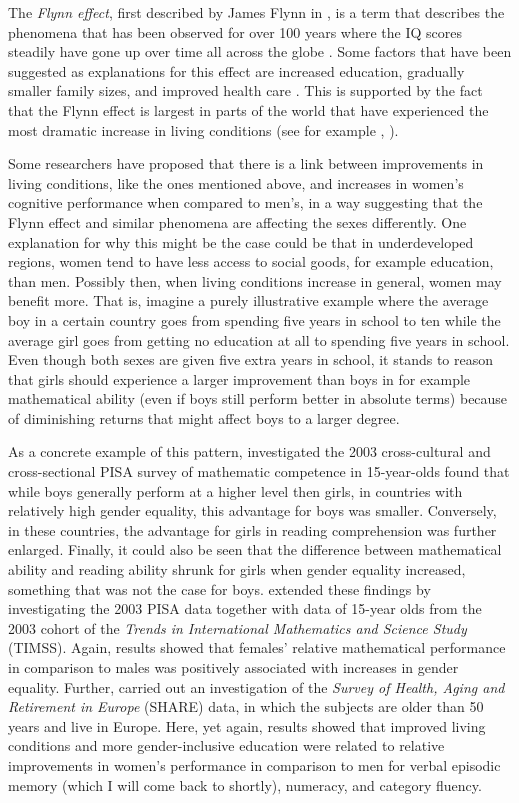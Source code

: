 The \emph{Flynn effect}, first described by James Flynn in \citeyear{Flynn1987}, is a term that describes the phenomena that has been observed for over 100 years where the IQ scores steadily have gone up over time all across the globe \parencite{Williams2013}. Some factors that have been suggested as explanations for this effect are increased education, gradually smaller family sizes, and improved health care \parencite{Pietschnig2015}. This is supported by the fact that the Flynn effect is largest in parts of the world that have experienced the most dramatic increase in living conditions (see for example \citeauthor{Weber2017}, \citeyear{Weber2017}).

Some researchers have proposed that there is a link between improvements in living conditions, like the ones mentioned above, and increases in women’s cognitive performance when compared to men's, in a way suggesting that the Flynn effect and similar phenomena are affecting the sexes differently. One explanation for why this might be the case could be that in underdeveloped regions, women tend to have less access to social goods, for example education, than men. Possibly then, when living conditions increase in general, women may benefit more. That is, imagine a purely illustrative example where the average boy in a certain country goes from spending five years in school to ten while the average girl goes from getting no education at all to spending five years in school. Even though both sexes are given five extra years in school, it stands to reason that girls should experience a larger improvement than boys in for example mathematical ability (even if boys still perform better in absolute terms) because of diminishing returns that might affect boys to a larger degree.

As a concrete example of this pattern, \textcite{Guiso2008} investigated the 2003 cross-cultural and cross-sectional PISA survey of mathematic competence in 15-year-olds found that while boys generally perform at a higher level then girls, in countries with relatively high gender equality, this advantage for boys was smaller. Conversely, in these countries, the advantage for girls in reading comprehension was further enlarged. Finally, it could also be seen that the difference between mathematical ability and reading ability shrunk for girls when gender equality increased, something that was not the case for boys. \textcite{ElseQuest2010} extended these findings by investigating the 2003 PISA data together with data of 15-year olds from the 2003 cohort of the \emph{Trends in International Mathematics and Science Study} (TIMSS). Again, results showed that females' relative mathematical performance in comparison to males was positively associated with increases in gender equality. Further, \textcite{Weber2014} carried out an investigation of the \emph{Survey of Health, Aging and Retirement in Europe} (SHARE) data, in which the subjects are older than 50 years and live in Europe. Here, yet again, results showed that improved living conditions and more gender-inclusive education were related to relative improvements in women's performance in comparison to men for verbal episodic memory (which I will come back to shortly), numeracy, and category fluency.

